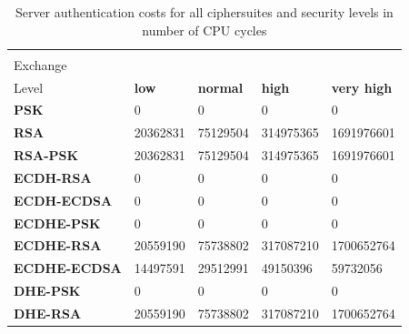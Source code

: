   \begin{table}[]
  \begin{tabular}{|l|l|l|l|l|}
  \hline
   \backslashbox{Key\\Exchange}{Security\\Level}                     & \textbf{low} & \textbf{normal} & \textbf{high} & \textbf{very high} \\ \hline
  \textbf{PSK}         & 0            & 0               & 0             & 0                  \\ \hline
  \textbf{RSA}         & 20362831     & 75129504        & 314975365     & 1691976601         \\ \hline
  \textbf{RSA-PSK}     & 20362831     & 75129504        & 314975365     & 1691976601         \\ \hline
  \textbf{ECDH-RSA}    & 0            & 0               & 0             & 0                  \\ \hline
  \textbf{ECDH-ECDSA}  & 0            & 0               & 0             & 0                  \\ \hline
  \textbf{ECDHE-PSK}   & 0            & 0               & 0             & 0                  \\ \hline
  \textbf{ECDHE-RSA}   & 20559190     & 75738802        & 317087210     & 1700652764         \\ \hline
  \textbf{ECDHE-ECDSA} & 14497591     & 29512991        & 49150396      & 59732056           \\ \hline
  \textbf{DHE-PSK}     & 0            & 0               & 0             & 0                  \\ \hline
  \textbf{DHE-RSA}     & 20559190     & 75738802        & 317087210     & 1700652764         \\ \hline
  \end{tabular}
	\centering \caption{\label{table:tls-auth-cost-server} Server authentication costs for all ciphersuites and security levels in number of CPU cycles}
  \end{table}
  
